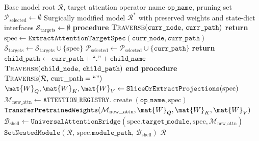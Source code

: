 \begin{algorithm}[t]
\caption[Recursive AST Module Inspection and In-Place Grafting]{Recursive AST Module Inspection and In-Place Grafting}
\label{alg:ast_grafting}
\begin{algorithmic}[1]
\REQUIRE Base model root $\mathcal{R}$, target attention operator name $\texttt{op\_name}$, pruning set $\mathcal{P}_{\text{selected}} \leftarrow \emptyset$
\ENSURE Surgically modified model $\mathcal{R}^*$ with preserved weights and state-dict interfaces
\STATE $\mathcal{S}_{\text{targets}} \leftarrow \emptyset$
\STATE \textbf{procedure} $\textsc{Traverse}(\texttt{curr\_node}, \, \texttt{curr\_path})$
        \STATE \textbf{return} 
    \ENDIF
        \STATE $\text{spec} \leftarrow \texttt{ExtractAttentionTargetSpec}(\texttt{curr\_node}, \texttt{curr\_path})$
        \STATE $\mathcal{S}_{\text{targets}} \leftarrow \mathcal{S}_{\text{targets}} \cup \{\text{spec}\}$
        \STATE $\mathcal{P}_{\text{selected}} \leftarrow \mathcal{P}_{\text{selected}} \cup \{\texttt{curr\_path}\}$
        \STATE \textbf{return}
    \ENDIF
        \STATE $\texttt{child\_path} \leftarrow \texttt{curr\_path} + \text{``.''} + \texttt{child\_name}$
        \STATE $\textsc{Traverse}(\texttt{child\_node}, \, \texttt{child\_path})$
    \ENDFOR
\STATE \textbf{end procedure}
\STATE $\textsc{Traverse}(\mathcal{R}, \, \text{curr\_path}=\text{``''})$
    \STATE $\mat{W}_Q, \mat{W}_K, \mat{W}_V \leftarrow \texttt{SliceOrExtractProjections}(\text{spec})$
    \STATE $\mathcal{M}_{\text{new\_attn}} \leftarrow \texttt{ATTENTION\_REGISTRY}.\operatorname{create}(\texttt{op\_name}, \text{spec})$
    \STATE $\texttt{TransferPretrainedWeights}(\mathcal{M}_{\text{new\_attn}}, \mat{W}_Q, \mat{W}_K, \mat{W}_V)$
    \STATE $\mathcal{B}_{\text{shell}} \leftarrow \texttt{UniversalAttentionBridge}(\text{spec}.\texttt{target\_module}, \text{spec}, \mathcal{M}_{\text{new\_attn}})$
    \STATE $\texttt{SetNestedModule}(\mathcal{R}, \, \text{spec}.\texttt{module\_path}, \, \mathcal{B}_{\text{shell}})$
\ENDFOR
\RETURN $\mathcal{R}$
\end{algorithmic}
\end{algorithm}

